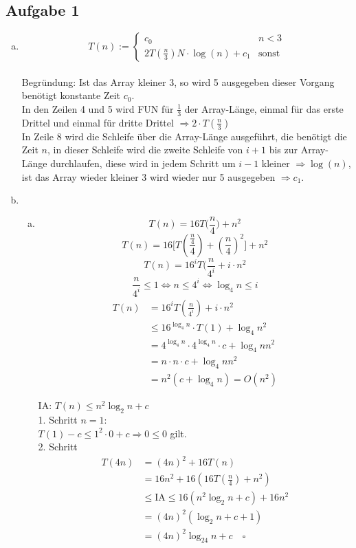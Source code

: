 \documentclass[a4paper,fleqn]{scrartcl}
\newcommand{\qed}{\quad \square}
\begin{document}
\subsection*{Aufgabe 1}
\begin{enumerate}[a)]
 \item
 \[ T(n):= \begin{cases}
    c_0 & n < 3 \\ 
    2T\left( \frac{n}{3} \right) N \cdot \log(n) + c_1 & \text{sonst}
   \end{cases}\] \\
   Begründung: Ist das Array kleiner 3, so wird 5 ausgegeben dieser Vorgang benötigt konstante Zeit $c_0$. \\
   In den Zeilen 4 und 5 wird FUN für $\frac{1}{3}$ der Array-Länge, einmal für das erste Drittel und einmal für dritte Drittel $\Rightarrow 2\cdot T(\frac{n}{3}) $ \\
   In Zeile 8 wird die Schleife über die Array-Länge ausgeführt, die benötigt die Zeit $n$, in dieser Schleife wird die zweite Schleife von $i+1$ bis zur Array-Länge durchlaufen, diese wird in jedem Schritt um $i-1$ kleiner $\Rightarrow \log(n)$, ist das Array wieder kleiner 3 wird wieder nur 5 ausgegeben $\Rightarrow c_1$.
 \item
 \begin{enumerate}[(a)]
  \item \[ T(n) = 16 T\Big(\frac n 4\Big) + n^2 \]
\[ T(n) = 16 \Big[T(\frac {\frac n 4} 4) + (\frac n 4)^2 \Big] + n^2\]
\[ T(n) = 16^i T(\frac n {4^i} + i \cdot n^2\]
\[ \frac n {4^i} \leq 1 \Leftrightarrow n \leq 4^i \Leftrightarrow \log_4 n \leq i \]
\begin{align*}
T(n) &= 16^i T(\frac n {4^i}) + i \cdot n^2\\
     &\leq 16^{\log_4 n} \cdot T(1) + \log_4 n^2\\
     &= 4^{\log_4 n} \cdot 4^{\log_4 n} \cdot c + \log_4 n n^2\\
     &= n \cdot n \cdot c + \log_4 n n^2\\
     &= n^2 (c + \log_4 n) = O(n^2)
\end{align*}

IA: $T(n) \leq n^2 \log_2 n + c$ \\
1. Schritt $n=1$: \\
$T(1) - c \leq 1^2 \cdot 0 + c \Rightarrow 0 \leq 0$ gilt. \\
2. Schritt 
\begin{align*}
 T(4n) &= (4n)^2 + 16 T(n) \\
       &= 16 n^2 + 16(16T\left(\frac{n}{4}\right) + n^2) \\
       &\leq \text{IA} \leq 16(n^2 \log_2n +c)+16n^2 \\
       &= (4n)^2(\log_2 n + c + 1) \\
       &= (4n)^2\log_24n +c \qed
\end{align*}




\end{enumerate}
\end{enumerate}
\end{document}
